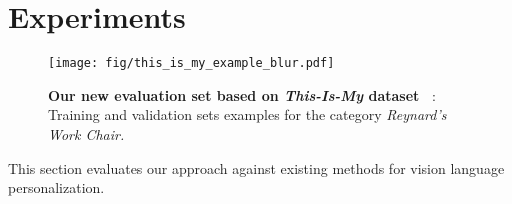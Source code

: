 \section{Experiments}
\vspace{-0.2cm}
\begin{figure*}[t]
    \centering
    \texttt{[image: fig/this\_is\_my\_example\_blur.pdf]}
        \vspace{-0.4cm}
    \caption{\textbf{Our new evaluation set \thisismy based on \textit{This-Is-My} dataset~\cite{yeh2023meta} }: Training and validation sets examples for the category \textit{Reynard's Work Chair.}}
        \vspace{-0.6cm}
    \label{fig:this_is}
\end{figure*}
\label{sec:experiments}
This section evaluates our approach against existing methods for vision language personalization.


